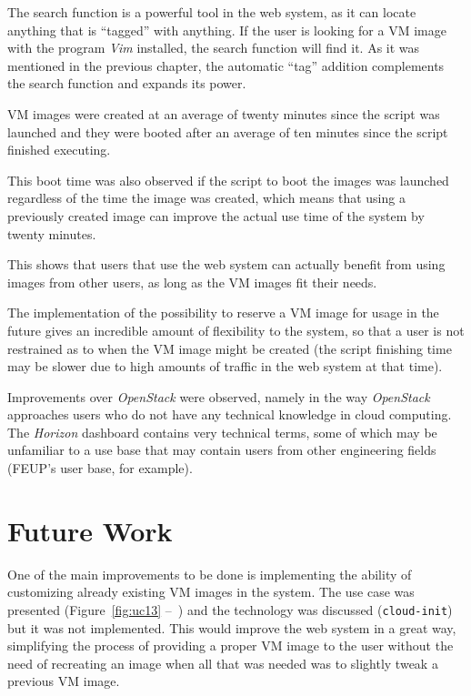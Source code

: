 The search function is a powerful tool in the web system, as it can locate anything that is ``tagged'' with anything. If the user is looking for a VM image with the program \textit{Vim} installed, the search function will find it. As it was mentioned in the previous chapter, the automatic ``tag'' addition complements the search function and expands its power.

VM images were created at an average of twenty minutes since the script was launched and they were booted after an average of ten minutes since the script finished executing.

This boot time was also observed if the script to boot the images was launched regardless of the time the image was created, which means that using a previously created image can improve the actual use time of the system by twenty minutes.

This shows that users that use the web system can actually benefit from using images from other users, as long as the VM images fit their needs.

The implementation of the possibility to reserve a VM image for usage in the future gives an incredible amount of flexibility to the system, so that a user is not restrained as to when the VM image might be created (the script finishing time may be slower due to high amounts of traffic in the web system at that time).

Improvements over \textit{OpenStack} were observed, namely in the way \textit{OpenStack} approaches users who do not have any technical knowledge in cloud computing. The \textit{Horizon} dashboard contains very technical terms, some of which may be unfamiliar to a use base that may contain users from other engineering fields (FEUP's user base, for example).

\section{Future Work}\label{sec:future-work}

One of the main improvements to be done is implementing the ability of customizing already existing VM images in the system. The use case was presented (Figure~\ref{fig:uc13} --~) and the technology was discussed (\texttt{cloud-init}) but it was not implemented. 
This would improve the web system in a great way, simplifying the process of providing a proper VM image to the user without the need of recreating an image when all that was needed was to slightly tweak a previous VM image.

